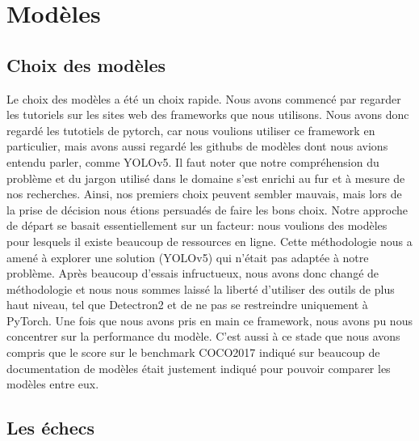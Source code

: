 \chapter{Modèles}

\section{Choix des modèles}
Le choix des modèles a été un choix rapide.\newline
Nous avons commencé par regarder les tutoriels sur les sites web des frameworks que nous utilisons. Nous avons donc regardé les tutotiels de pytorch, car nous voulions utiliser ce framework en particulier, mais avons aussi regardé les githubs de modèles dont nous avions entendu parler, comme YOLOv5. Il faut noter que notre compréhension du problème et du jargon utilisé dans le domaine s’est enrichi au fur et à mesure de nos recherches. \newline 
Ainsi, nos premiers choix peuvent sembler mauvais, mais lors de la prise de décision nous étions persuadés de faire les bons choix. Notre approche de départ se basait essentiellement sur un facteur: nous voulions des modèles pour lesquels il existe beaucoup de ressources en ligne. Cette méthodologie nous a amené à explorer une solution (YOLOv5) qui n’était pas adaptée à notre problème. \newline
Après beaucoup d’essais infructueux, nous avons donc changé de méthodologie et nous nous sommes laissé la liberté d’utiliser des outils de plus haut niveau, tel que Detectron2 et de ne pas se restreindre uniquement à PyTorch. Une fois que nous avons pris en main ce framework, nous avons pu nous concentrer sur la performance du modèle. C'est aussi à ce stade que nous avons compris que le score sur le benchmark COCO2017 indiqué sur beaucoup de documentation de modèles était justement indiqué pour pouvoir comparer les modèles entre eux.

\section{Les échecs}
